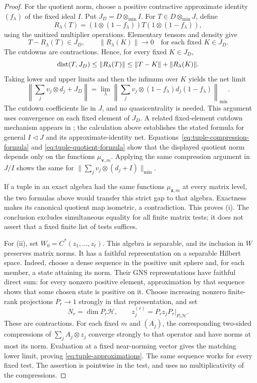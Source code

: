 \begin{proof}
For the quotient norm, choose a positive contractive approximate
identity \((f_\lambda)\) of the fixed ideal \(I\).  Put
\(J_D=D\otimes_{\min}I\).  For \(T\in D\otimes_{\min}J\), define
\[
 R_\lambda(T)
 =(1\otimes(1-f_\lambda))T(1\otimes(1-f_\lambda)),
\]
using the unitized multiplier operations.  Elementary tensors and
density give
\[
 T-R_\lambda(T)\in J_D,\qquad
 \|R_\lambda(K)\|\longrightarrow0\quad\text{for each fixed }K\in J_D.
\]
The cutdowns are contractions.  Hence, for every fixed \(K\in J_D\),
\[
 \operatorname{dist}(T,J_D)\le\|R_\lambda(T)\|
 \le\|T-K\|+\|R_\lambda(K)\|.
\]
Taking lower and upper limits and then the infimum over \(K\) yields
the net limit
\begin{equation}\label{eq:tuple-quotient-formula}
 \left\|\sum_j v_j\otimes d_j+J_D\right\|
 =\lim_\lambda
 \left\|\sum_j v_j\otimes
 (1-f_\lambda)d_j(1-f_\lambda)\right\|_{\min}.
\end{equation}
The cutdown coefficients lie in \(J\), and no quasicentrality is
needed.  This argument uses convergence on each fixed element of
\(J_D\).  A related fixed-element cutdown mechanism appears in
\cite[proof of Lemma~3, p.~165]{Pisier1995}; the calculation above
establishes the stated formula for general \(I\triangleleft J\) and
its approximate-identity net.  Equations~\eqref{eq:tuple-compression-formula} and
\eqref{eq:tuple-quotient-formula} show that the displayed quotient
norm depends only on the functions \(\mu_{\mathbf v,m}\).  Applying
the same compression argument in \(J/I\) shows the same for
\(\|\sum_j v_j\otimes(d_j+I)\|_{\min}\).

If a tuple in an exact algebra had the same functions
\(\mu_{\mathbf z,m}\) at every matrix level, the two formulas above
would transfer this strict gap to that algebra.  Exactness makes its
canonical quotient map isometric, a contradiction.  This proves
(i).  The conclusion excludes simultaneous equality for all finite
matrix tests; it does not assert that a fixed finite list of tests
suffices.

For (ii), set \(W_0=C^*(z_1,\ldots,z_\ell)\).  This algebra is
separable, and its inclusion in \(W\) preserves matrix norms.  It
has a faithful representation on a separable Hilbert space.  Indeed,
choose a dense sequence in the positive unit sphere and, for each
member, a state attaining its norm.  Their GNS representations have
faithful direct sum: for every nonzero positive element, approximation
by that sequence shows that some chosen state is positive on it.
Choose increasing nonzero
finite-rank projections \(P_r\to1\) strongly in that representation,
and set
\[
 N_r=\dim P_r\mathcal H,\qquad
 z_j^{(r)}=P_rz_jP_r\big|_{P_r\mathcal H}.
\]
These are contractions.  For each fixed \(m\) and \((A_j)\), the
corresponding two-sided compressions of \(\sum_j A_j\otimes z_j\)
converge strongly to that operator and have norms at most its norm.
Evaluation at a fixed near-norming vector gives the matching lower
limit, proving \eqref{eq:tuple-approximations}.  The same sequence
works for every fixed test.  The assertion is pointwise in the test,
and uses no multiplicativity of the compressions.
\end{proof}

